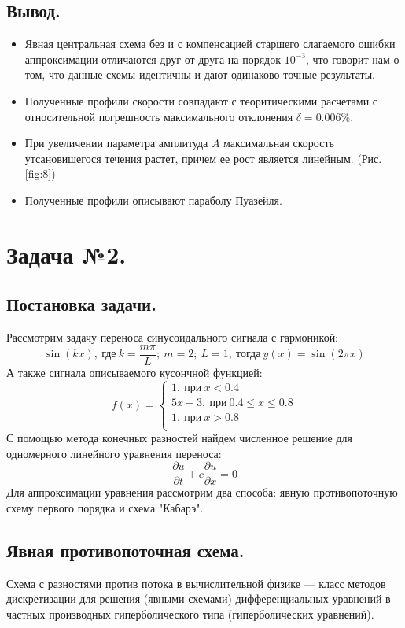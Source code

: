 \subsection{Вывод.}
\begin{itemize}
    \item Явная центральная схема без и с компенсацией старшего слагаемого ошибки аппроксимации отличаются друг от друга на порядок $10^{-3}$, что говорит нам о том, что данные схемы идентичны и дают одинаково точные результаты.
    \item Полученные профили скорости совпадают с теоритическими расчетами с относительной погрешность максимального отклонения $\delta = 0.006\%$.
    \item При увеличении параметра амплитуда $A$ максимальная скорость утсановишегося течения растет, причем ее рост является линейным. (Рис. \ref{fig:8})
    \item Полученные профили описывают параболу Пуазейля.
\end{itemize}

\section{Задача №2.}
\subsection{Постановка задачи.}
Рассмотрим задачу переноса синусоидального сигнала с гармоникой: $$\sin(kx),~ \text{где}~ k=\frac{m\pi}{L}; ~m=2; ~L=1, ~\text{тогда}~ y(x)=\sin(2\pi x)$$
А также сигнала описываемого кусончной функцией: 
\begin{equation}
    f(x)=
    \begin{cases}
        1, ~\text{при}~ x<0.4 \\
        5x-3,~ \text{при}~ 0.4 \leq x \leq 0.8 \\
        1, ~\text{при}~ x>0.8 \\
    \end{cases}
\end{equation}
С помощью метода конечных разностей найдем численное решение для одномерного линейного уравнения переноса:
$$\frac{\partial u}{\partial t}+c \frac{\partial u}{\partial x}=0$$
Для аппроксимации уравнения рассмотрим два способа: явную противопоточную схему первого порядка и схема "Кабарэ". 
\subsection{Явная противопоточная схема.}
Схема с разностями против потока в вычислительной физике — класс методов дискретизации для решения (явными схемами) дифференциальных уравнений в частных производных гиперболического типа (гиперболических уравнений).

